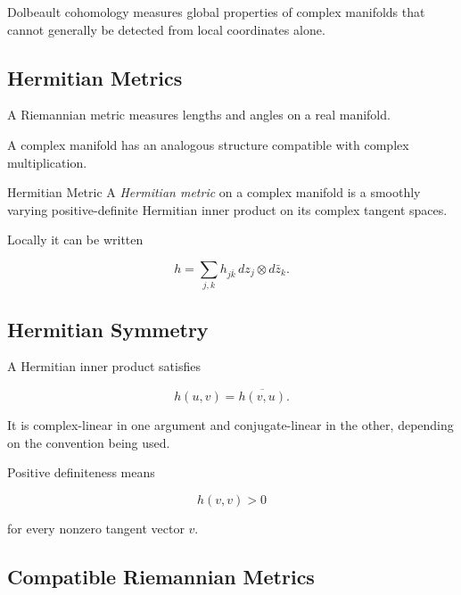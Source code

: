Dolbeault cohomology measures global properties of complex manifolds that
cannot generally be detected from local coordinates alone.

\subsection{Hermitian Metrics}
\label{subsec:hermitian-metrics}

A Riemannian metric measures lengths and angles on a real manifold.

A complex manifold has an analogous structure compatible with complex
multiplication.

\begin{definitionbox}{Hermitian Metric}
A \emph{Hermitian metric} on a complex manifold is a smoothly varying
positive-definite Hermitian inner product on its complex tangent spaces.
\end{definitionbox}

Locally it can be written

\[
\boxed{
h
=
\sum_{j,k}
h_{j\bar k}\,
dz_j\otimes d\bar z_k.
}
\]

\subsection{Hermitian Symmetry}
\label{subsec:hermitian-symmetry}

A Hermitian inner product satisfies

\[
\boxed{
h(u,v)
=
\overline{h(v,u)}.
}
\]

It is complex-linear in one argument and conjugate-linear in the other,
depending on the convention being used.

Positive definiteness means

\[
\boxed{
h(v,v)>0
}
\]

for every nonzero tangent vector \(v\).

\subsection{Compatible Riemannian Metrics}
\label{subsec:compatible-riemannian-metric}

